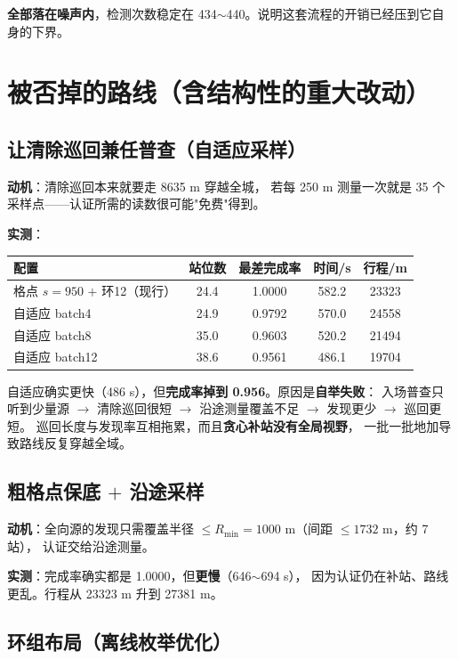 \textbf{全部落在噪声内}，检测次数稳定在 434$\sim$440。说明这套流程的开销已经压到它自身的下界。

\section{被否掉的路线（含结构性的重大改动）}

\subsection{让清除巡回兼任普查（自适应采样）}

\textbf{动机}：清除巡回本来就要走 8635 m 穿越全城，
若每 250 m 测量一次就是 35 个采样点——认证所需的读数很可能"免费"得到。

\textbf{实测}：

\begin{center}
\begin{tabular}{lcccc}
\toprule
配置 & 站位数 & 最差完成率 & 时间/s & 行程/m \\ \midrule
格点 $s{=}950$ $+$ 环12（现行） & 24.4 & 1.0000 & 582.2 & 23323 \\
自适应 batch4 & 24.9 & 0.9792 & 570.0 & 24558 \\
自适应 batch8 & 35.0 & 0.9603 & 520.2 & 21494 \\
自适应 batch12 & 38.6 & 0.9561 & 486.1 & 19704 \\
\bottomrule
\end{tabular}
\end{center}

自适应确实更快（486 s），但\textbf{完成率掉到 0.956}。原因是\textbf{自举失败}：
入场普查只听到少量源 $\to$ 清除巡回很短 $\to$ 沿途测量覆盖不足 $\to$ 发现更少 $\to$ 巡回更短。
巡回长度与发现率互相拖累，而且\textbf{贪心补站没有全局视野}，
一批一批地加导致路线反复穿越全域。

\subsection{粗格点保底 $+$ 沿途采样}

\textbf{动机}：全向源的发现只需覆盖半径 $\le R_{\min}=1000$ m（间距 $\le1732$ m，约 7 站），
认证交给沿途测量。

\textbf{实测}：完成率确实都是 1.0000，但\textbf{更慢}（646$\sim$694 s），
因为认证仍在补站、路线更乱。行程从 23323 m 升到 27381 m。

\subsection{环组布局（离线枚举优化）}

